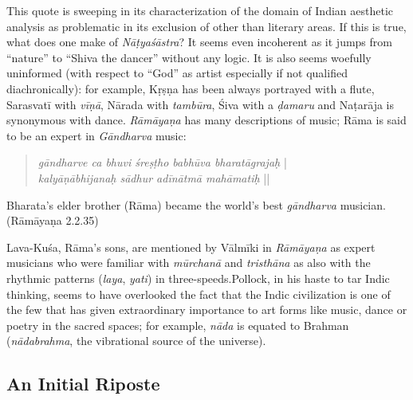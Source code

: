This quote is sweeping in its characterization of the domain of Indian aesthetic analysis as problematic in its exclusion of other than literary areas. If this is true, what does one make of \textsl{Nāṭyaśāstra}? It seems even incoherent as it jumps from “nature” to “Shiva the dancer” without any logic. It is also seems woefully uninformed (with respect to “God” as artist especially if not qualified diachronically): for example, Kṛṣṇa has been always portrayed with a flute, Sarasvatī with \textsl{vīṇā}, Nārada with \textsl{tambūra}, Śiva with a \textsl{ḍamaru} and Naṭarāja is synonymous with dance. \textsl{Rāmāyaṇa} has many descriptions of music; Rāma is said to be an expert in \textsl{Gāndharva} music:

\begin{quote}
\textsl{gāndharve ca bhuvi śreṣṭho babhūva bharatāgrajaḥ} |\\
\textsl{kalyāṇābhijanaḥ sādhur adīnātmā mahāmatiḥ} ||
\end{quote}

\begin{myquote}
Bharata’s elder brother (Rāma) became the world’s best \textsl{gāndharva} musician. 
\hfill(Rāmāyaṇa 2.2.35)
\end{myquote}

\newpage

Lava-Kuśa, Rāma’s sons, are mentioned by Vālmīki in \textsl{Rāmāyaṇa} as expert musicians who were familiar with \textsl{mūrchanā} and \textsl{tristhāna} as also with the rhythmic patterns (\textsl{laya}, \textsl{yati}) in three-speeds.Pollock, in his haste to tar Indic thinking, seems to have overlooked the fact that the Indic civilization is one of the few that has given extraordinary importance to art forms like music, dance or poetry in the sacred spaces; for example, \textsl{nāda} is equated to Brahman (\textsl{nādabrahma}, the vibrational source of the universe).\\[-20pt]

\subsection{An Initial Riposte}\label{chap3-sec1.1}

